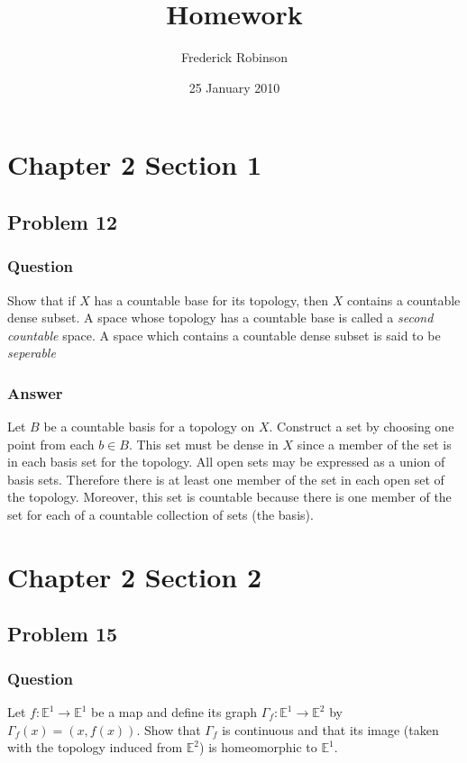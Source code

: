 \documentclass[10pt]{article}
\title{Homework}
\author{Frederick Robinson}
\date{25 January 2010}
\begin{document}

   \maketitle



\section{Chapter 2 Section 1}

\subsection{Problem 12}

\subsubsection{Question}
Show that if $X$ has a countable base for its topology, then $X$ contains a countable dense subset. A space whose topology has a countable base is called a \emph{second countable} space. A space which contains a countable dense subset is said to be \emph{seperable}
\subsubsection{Answer} 
Let $B$  be a countable basis for a topology on $X$. Construct a set by choosing one point from each $b \in B$. This set must be dense in $X$ since a member of the set is in each basis set for the topology. All open sets may be expressed as a union of basis sets.  Therefore there is at least one member of the set in each open set of the topology. Moreover, this set is countable because there is one member of the set for each of a countable collection of sets (the basis).

\section{Chapter 2 Section 2}

\subsection{Problem 15}

\subsubsection{Question}
Let $f:\mathbb{E}^1 \to \mathbb{E}^1$ be a map and define its graph $\Gamma_f : \mathbb{E}^1 \to \mathbb{E}^2$ by $\Gamma_f(x) = (x,f(x))$. Show that $\Gamma_f$ is continuous and that its image (taken with the topology induced from $\mathbb{E}^2$) is homeomorphic to $\mathbb{E}^1$.
\end{document}
